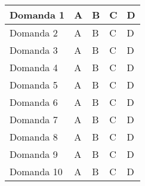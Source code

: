 \documentclass{book}
\begin{document}
\begin{longtable}{|l|m{3cm}|m{3cm}|m{3cm}|m{3cm}|}
        \hline
        Domanda 1 & A & B & C & D \\
        \hline
        Domanda 2 & A & B & C & D \\
        \hline
        Domanda 3 & A & B & C & D \\
        \hline
        Domanda 4 & A & B & C & D \\
        \hline
        Domanda 5 & A & B & C & D \\
        \hline
        Domanda 6 & A & B & C & D \\
        \hline
        Domanda 7 & A & B & C & D \\
        \hline
        Domanda 8 & A & B & C & D \\
        \hline
        Domanda 9 & A & B & C & D \\
        \hline
        Domanda 10 & A & B & C & D \\
        \hline
    \end{longtable} 
\end{document}
